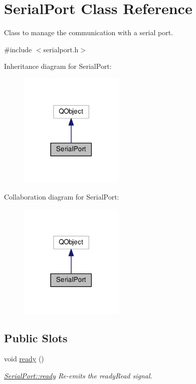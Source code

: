 \hypertarget{class_serial_port}{\section{Serial\-Port Class Reference}
\label{class_serial_port}
}


Class to manage the communication with a serial port.  




{\ttfamily \#include $<$serialport.\-h$>$}



Inheritance diagram for Serial\-Port\-:\nopagebreak
\begin{figure}[H]
\begin{center}
\leavevmode
\includegraphics[width=141pt]{class_serial_port__inherit__graph}
\end{center}
\end{figure}


Collaboration diagram for Serial\-Port\-:\nopagebreak
\begin{figure}[H]
\begin{center}
\leavevmode
\includegraphics[width=141pt]{class_serial_port__coll__graph}
\end{center}
\end{figure}
\subsection*{Public Slots}
\begin{DoxyCompactItemize}
\item 
void \hyperlink{class_serial_port_a76a7bb63e3f581ccb55a5951bf97a4e3}{ready} ()
\begin{DoxyCompactList}\small\item\em \hyperlink{class_serial_port_a76a7bb63e3f581ccb55a5951bf97a4e3}{Serial\-Port\-::ready} Re-\/emits the ready\-Read signal. \end{DoxyCompactList}\end{DoxyCompactItemize}
